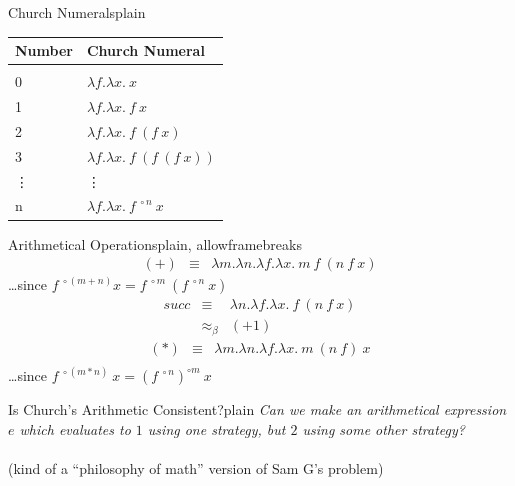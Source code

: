 \documentclass{beamer}
\begin{document}

\begin{subsectionframe}{Church Numerals}{plain}
  \begin{table}
    \begin{tabular}{ll}
      Number & Church Numeral \\
      \hline
      & \\
      0 & $\lambda f. \lambda x.\ x$ \\
      1 & $\lambda f. \lambda x.\ f\ x$ \\
      2 & $\lambda f. \lambda x.\ f\ (f\ x)$ \\
      3 & $\lambda f. \lambda x.\ f\ (f\ (f\ x))$ \\
      \vdots & \vdots \\
      n & $\lambda f. \lambda x.\ f^{\; \circ n}\ x$
    \end{tabular}
  \end{table}
\end{subsectionframe}

\begin{subsectionframe}{Arithmetical Operations}{plain, allowframebreaks}
  \begin{eqnarray*}
    (+) & \equiv & \lambda m. \lambda n. \lambda f. \lambda x.\ m\ f\ (n\ f\ x)
  \end{eqnarray*}
  \ldots since $f^{\; \circ (m + n)} x = f^{\; \circ m}\ (f^{\; \circ n}\ x)$
  \framebreak
  \begin{eqnarray*}
    succ & \equiv & \lambda n. \lambda f. \lambda x.\ f\ (n\ f\ x) \\
         & \approx_\beta &  (+ 1)
  \end{eqnarray*}
  \framebreak
  \begin{eqnarray*}
    (\ast) & \equiv & \lambda m. \lambda n. \lambda f. \lambda x.\ m\ (n\ f)\ x\\
  \end{eqnarray*}
  \ldots since $f^{\; \circ (m * n)}\ x = (f^{\; \circ n})^{\circ m}\ x$
\end{subsectionframe}

\begin{subsectionframe}{Is Church's Arithmetic Consistent?}{plain}
  \emph{Can we make an arithmetical expression $e$ which evaluates to $1$ using one strategy, but $2$ using some other strategy?}
  \\~\\
  (kind of a ``philosophy of math'' version of Sam G's problem)
\end{subsectionframe}
\end{document}
